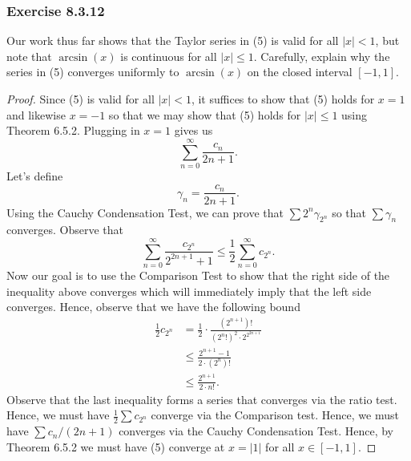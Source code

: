 \subsubsection{Exercise 8.3.12} Our work thus far shows that the Taylor series in (5) is valid  for all \( |  x  |  < 1  \), but note that \( \arcsin(x)  \) is continuous for all \( |  x  | \leq 1   \). Carefully, explain why the series in (5) converges uniformly to \( \arcsin(x)  \) on the closed interval \( [-1,1] \).
\begin{proof}
Since (5) is valid for all \( |  x  | < 1   \), it suffices to show that (5) holds for \( x = 1  \) and likewise \( x = -1  \) so that we may show that (5) holds for \( |  x  | \leq 1  \) using Theorem 6.5.2. Plugging in \( x = 1  \) gives us 
\[  \sum_{ n=0 }^{ \infty  } \frac{ c_{n}  }{  2n+1  }. \] Let's define 
\[  \gamma_{n} = \frac{ c_{n}  }{  2n+1  }. \]Using the Cauchy Condensation Test, we can prove that  \( \sum 2^{n} \gamma_{2^n }  \) so that \( \sum \gamma_{n}   \) converges. Observe that 
\[  \sum_{ n=0 }^{ \infty  } \frac{ c_{2^n} }{ 2^{2n+1} + 1 } \leq \frac{ 1 }{ 2 } \sum_{ n=0 }^{ \infty  } c_{2^{n}}. \]
Now our goal is to use the Comparison Test to show that the right side of the inequality above converges which will immediately imply that the left side converges. Hence, observe that we have the following bound
\begin{align*}
    \frac{ 1 }{ 2 }  c_{2^{n}} &= \frac{ 1 }{ 2 }  \cdot \frac{ (2^{n+1})! }{ (2^{n}!)^{2} \cdot 2^{2^{2n+1}}  }  \\
                               &\leq \frac{ 2^{n+1} - 1  }{ 2 \cdot (2^{n})!  } \\  
                               &\leq \frac{ 2^{n+1} }{ 2 \cdot n! }.  
\end{align*}
Observe that the last inequality forms a series that converges via the ratio test. Hence, we must have \( \frac{ 1 }{  2 } \sum c_{2^{n}}  \) converge via the Comparison test. Hence, we must have  \(  \sum  c_{n} / (2n+1)  \) converges via the Cauchy Condensation Test. Hence, by Theorem 6.5.2 we must have (5) converge at \( x = |  1  |  \) for all \(  x \in [-1 , 1 ]  \).
\end{proof}


